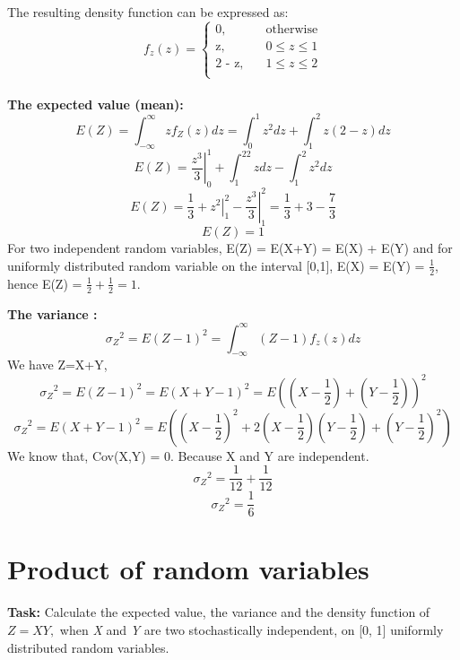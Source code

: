 The resulting density function can be expressed as:
\[ f_z(z)=
	\begin{cases}
		\text{0,} &\quad\text{otherwise}\\
		\text{z,} &\quad\text{$0 \leq z \leq 1$}\\
		\text{2 - z,} &\quad\text{$1 \leq z \leq 2$}\\	
		\end{cases}
\]\\
\noindent \textbf{The expected value (mean):}
$$ E(Z) = \int_{-\infty}^{\infty} z f_Z(z) dz = \int_0^1 z^2 dz + \int_1^2z(2-z) dz $$
$$ E(Z) = \left.\frac{z^3}{3}\right|_0^1+\int_1^22zdz - \int_1^2 z^2 dz$$
$$ E(Z) = \frac{1}{3} + \left. z^2 \right|_1^2 - \left.\frac{z^3}{3}\right|_1^2 = \frac{1}{3} + 3- \frac{7}{3}$$
$$E(Z) = 1$$
\noindent For two independent random variables, E(Z) = E(X+Y) = E(X) + E(Y) and for uniformly distributed  random variable on the interval [0,1], E(X) = E(Y) = $\frac{1}{2}$, hence E(Z) = $\frac{1}{2} + \frac{1}{2} = 1 $.

\noindent \textbf{The variance :}
$${\sigma_Z}^{2} = E(Z-1)^2 = \int_{-\infty}^{\infty}(Z-1)f_z(z) dz$$
We have Z=X+Y,
$${\sigma_Z}^{2} =E(Z-1)^2 = E(X+Y-1)^2 = E\left(\left(X-\frac{1}{2}\right)+\left(Y-\frac{1}{2}\right)\right)^2$$
$${\sigma_Z}^{2} = E(X+Y-1)^2 = E\left(\left(X-\frac{1}{2}\right)^2+2\left(X-\frac{1}{2}\right)\left(Y-\frac{1}{2}\right)+\left(Y-\frac{1}{2}\right)^2\right)$$
\noindent We know that, Cov(X,Y) = 0. Because X and Y are independent.
$${\sigma_Z}^{2} = \frac{1}{12} + \frac{1}{12} $$
$${\sigma_Z}^{2}=\frac{1}{6}$$


\section{Product of random variables}
\noindent \textbf{Task:} Calculate the expected value, the variance and the density function of $Z = XY,$ when \textit{X} and \textit{Y} are two stochastically independent, on [0, 1] uniformly distributed random variables.\\

